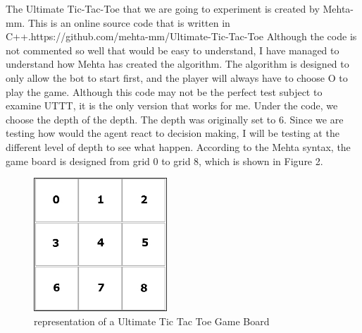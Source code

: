 \documentclass[12pt]{article}
\begin{document}
The Ultimate Tic-Tac-Toe that we are going to experiment is created by Mehta-mm. This is an online source code that is written in C++.https://github.com/mehta-mm/Ultimate-Tic-Tac-Toe Although the code is not commented so well that would be easy to understand, I have managed to understand how Mehta has created the algorithm. The algorithm is designed to only allow the bot to start first, and the player will always have to choose O to play the game. Although this code may not be the perfect test subject to examine UTTT, it is the only version that works for me. Under the code, we choose the depth of the depth. The depth was originally set to 6. Since we are testing how would the agent react to decision making, I will be testing at the different level of depth to see what happen. According to the Mehta syntax, the game board is designed from grid 0 to grid 8, which is shown in Figure 2.
\begin{figure}
\begin{center}
\includegraphics[width=5cm,height=5cm]{0-8_TTT.jpg}
\caption{representation of a Ultimate Tic Tac Toe Game Board}
\end{center}
\end{figure}
\newline
\end{document}

